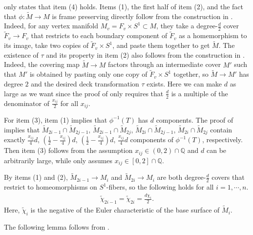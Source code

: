 \documentclass{amsart}
\numberwithin{equation}{section}
\theoremstyle{definition}
\begin{document}
\cite[Lemma 2.4]{WY} only states that item (4) holds. Items (1), the first half of item (2), and the fact that $\phi:\tilde{M}\to M$ is frame preserving directly follow from the construction in \cite[Lemma 2.4]{WY}. Indeed, for any vertex manifold $M_v=F_v\times S^1\subset M$, they take a degree-$\frac{d}{2}$ cover $\tilde{F}_v\to F_v$ that restricts to each boundary component of $\tilde{F}_v$ as a homemorphism to its image, take two copies of $\tilde{F}_v\times S^1$, and paste them together to get $\tilde{M}$. The existence of $\tau$ and its property in item (2) also follows from the construction in \cite[Lemma 2.4]{WY}. Indeed, the covering map $\tilde{M}\to M$ factors through an intermediate cover $M'$ such that $M'$ is obtained by pasting only one copy of $\tilde{F}_v\times S^1$ together, so $\tilde{M}\to M'$ has degree $2$ and the desired deck transformation $\tau$ exists. Here we can make $d$ as large as we want since the proof of \cite[Lemma 2.4]{WY} only requires that $\frac{d}{2}$ is a multiple of the denominator of $\frac{x_{ij}}{2}$ for all $x_{ij}$.

For item (3), item (1) implies that $\phi^{-1}(T)$ has $d$ components. The proof of \cite[Lemma 2.4]{WY} implies that $\tilde{M}_{2i-1}\cap \tilde{M}_{2j-1}$, $\tilde{M}_{2i-1}\cap \tilde{M}_{2j}$, $\tilde{M}_{2i}\cap \tilde{M}_{2j-1}$, $\tilde{M}_{2i}\cap \tilde{M}_{2j}$ contain exactly $\frac{x_{ij}}{4}d$, $(\frac{1}{2}-\frac{x_{ij}}{4})d$, $(\frac{1}{2}-\frac{x_{ij}}{4})d$, $\frac{x_{ij}}{4}d$ components of $\phi^{-1}(T)$, respectively. Then item (3) follows from the assumption $x_{ij}\in (0,2)\cap \mathbb{Q}$ and $d$ can be arbitrarily large, while \cite[Lemma 2.4]{WY} only assumes $x_{ij}\in [0,2]\cap \mathbb{Q}$. 

By items (1) and (2), $\tilde{M}_{2i-1}\to M_{i}$ and  $\tilde{M}_{2i}\to M_{i}$ are both degree-$\frac{d}{2}$ covers that restrict to homeomorphisms on $S^1$-fibers, so the following holds for all $i=1,\cdots,n$.
\begin{align}\label{5.12}
\tilde{\chi}_{2i-1}=\tilde{\chi}_{2i}=\frac{d\chi_i}{2}.
\end{align}
Here, $\tilde{\chi}_i$ is the negative of the Euler characteristic of the base surface of $\tilde{M}_i$.

The following lemma follows from \cite[Lemma 3.1]{WY}.
\end{document}
